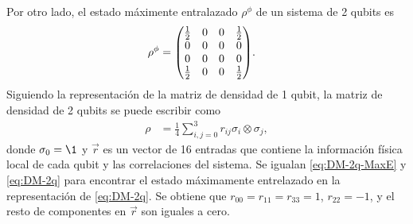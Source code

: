 Por otro lado, el estado máximente entralazado $\rho^{\phi}$ de 
un sistema de 2 qubits es \cite{bengtsson_zyczkowski_2017}
\begin{align}
\rho^{\phi}&=
\mqty( 
\frac{1}{2} & 0 & 0 & \frac{1}{2} \\
0 & 0 & 0 & 0 \\
0 & 0 & 0 & 0 \\
\frac{1}{2} & 0 & 0 & \frac{1}{2} \\
).
\label{eq:DM-2q-MaxE}
\end{align}
Siguiendo la representación de la matriz de densidad de 1 qubit,
la matriz de densidad de 2 qubits se puede escribir como
\begin{align}
\rho&=\frac{1}{4}\sum _{i,j=0}^{3}r_{ij}\sigma_i\otimes\sigma_j,
\label{eq:DM-2q}
\end{align}
donde $\sigma_0=\1$ y $\vec{r}$ es un vector de 16 entradas que contiene
la información física local de cada qubit y las correlaciones del sistema.
Se igualan \eqref{eq:DM-2q-MaxE} y \eqref{eq:DM-2q} para encontrar
el estado máximamente entrelazado en la representación de \eqref{eq:DM-2q}. 
Se obtiene que $r_{00}=r_{11}=r_{33}=1$, $r_{22}=-1$, y el resto de 
componentes en $\vec{r}$ son iguales a cero. 

